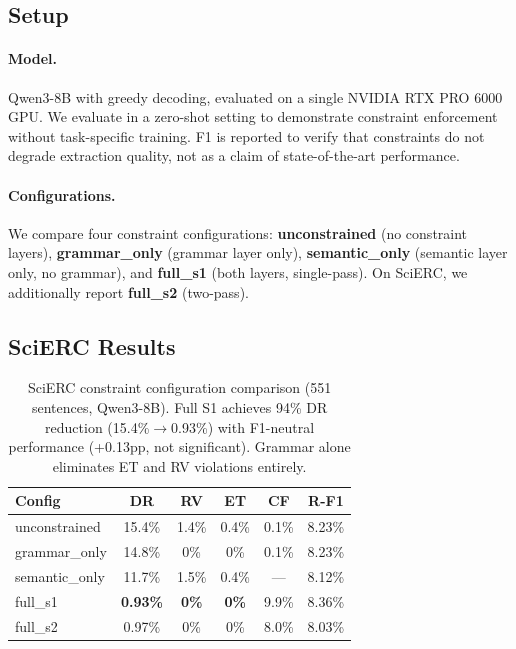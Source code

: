 \documentclass[11pt,a4paper]{article}
\begin{document}
\subsection{Setup}

\paragraph{Model.} Qwen3-8B with greedy decoding, evaluated on a single NVIDIA RTX PRO 6000 GPU.
We evaluate in a zero-shot setting to demonstrate constraint enforcement without task-specific training.
F1 is reported to verify that constraints do not degrade extraction quality, not as a claim of state-of-the-art performance.

\paragraph{Configurations.} We compare four constraint configurations: \textbf{unconstrained} (no constraint layers), \textbf{grammar\_only} (grammar layer only), \textbf{semantic\_only} (semantic layer only, no grammar), and \textbf{full\_s1} (both layers, single-pass).
On SciERC, we additionally report \textbf{full\_s2} (two-pass).

\subsection{SciERC Results}

\begin{table}[t]
\centering
\small
\begin{tabular}{lccccc}
\toprule
\textbf{Config} & \textbf{DR} & \textbf{RV} & \textbf{ET} & \textbf{CF} & \textbf{R-F1} \\
\midrule
unconstrained & 15.4\% & 1.4\% & 0.4\% & 0.1\% & 8.23\% \\
grammar\_only & 14.8\% & 0\% & 0\% & 0.1\% & 8.23\% \\
semantic\_only & 11.7\% & 1.5\% & 0.4\% & --- & 8.12\% \\
full\_s1 & \textbf{0.93\%} & \textbf{0\%} & \textbf{0\%} & 9.9\% & 8.36\% \\
full\_s2 & 0.97\% & 0\% & 0\% & 8.0\% & 8.03\% \\
\bottomrule
\end{tabular}
\caption{SciERC constraint configuration comparison (551 sentences, Qwen3-8B). Full S1 achieves 94\% DR reduction (15.4\%$\to$0.93\%) with F1-neutral performance (+0.13pp, not significant). Grammar alone eliminates ET and RV violations entirely.}
\label{tab:scierc-results}
\end{table}
\end{document}
